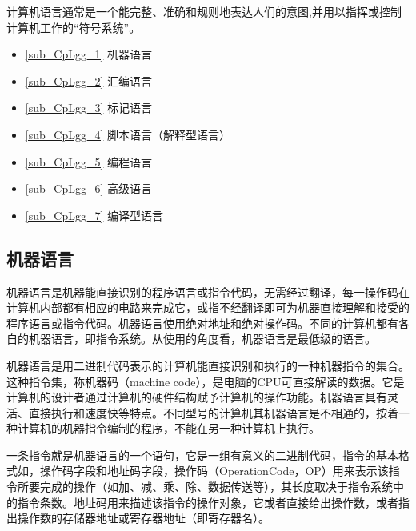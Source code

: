 
\begin{issues}
\issueTODO
\end{issues}

计算机语言通常是一个能完整、准确和规则地表达人们的意图,并用以指挥或控制计算机工作的“符号系统”。

\begin{itemize}
\item \autoref{sub_CpLgg_1} 机器语言

\item \autoref{sub_CpLgg_2} 汇编语言

\item \autoref{sub_CpLgg_3} 标记语言

\item \autoref{sub_CpLgg_4} 脚本语言（解释型语言）

\item \autoref{sub_CpLgg_5} 编程语言

\item \autoref{sub_CpLgg_6} 高级语言

\item \autoref{sub_CpLgg_7} 编译型语言
\end{itemize}

\subsection{机器语言}\label{sub_CpLgg_1}

机器语言是机器能直接识别的程序语言或指令代码，无需经过翻译，每一操作码在计算机内部都有相应的电路来完成它，或指不经翻译即可为机器直接理解和接受的程序语言或指令代码。机器语言使用绝对地址和绝对操作码。不同的计算机都有各自的机器语言，即指令系统。从使用的角度看，机器语言是最低级的语言。

机器语言是用二进制代码表示的计算机能直接识别和执行的一种机器指令的集合。这种指令集，称机器码（machine code），是电脑的CPU可直接解读的数据。它是计算机的设计者通过计算机的硬件结构赋予计算机的操作功能。机器语言具有灵活、直接执行和速度快等特点。不同型号的计算机其机器语言是不相通的，按着一种计算机的机器指令编制的程序，不能在另一种计算机上执行。

一条指令就是机器语言的一个语句，它是一组有意义的二进制代码，指令的基本格式如，操作码字段和地址码字段，操作码（OperationCode，OP）用来表示该指令所要完成的操作（如加、减、乘、除、数据传送等），其长度取决于指令系统中的指令条数。地址码用来描述该指令的操作对象，它或者直接给出操作数，或者指出操作数的存储器地址或寄存器地址（即寄存器名）。


